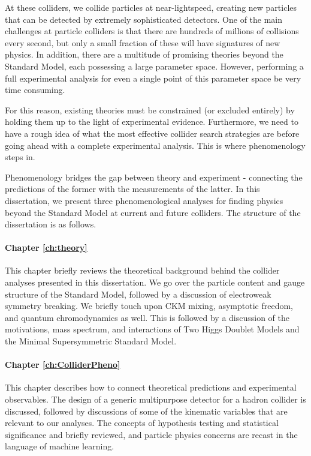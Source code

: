 At these colliders, we collide particles at near-lightspeed, creating new particles that can be detected by extremely sophisticated detectors. One of the main challenges at particle colliders is that there are hundreds of millions of collisions every second, but only a small fraction of these will have signatures of new physics. In addition, there are a multitude of promising theories beyond the Standard Model, each possessing a large parameter space. However, performing a full experimental analysis for even a single point of this parameter space be very time consuming.

For this reason, existing theories must be constrained (or excluded entirely) by holding them up to the light of experimental evidence. Furthermore, we need to have a rough idea of what the most effective collider search strategies are before going ahead with a complete experimental analysis. This is where phenomenology steps in.

Phenomenology bridges the gap between theory and experiment - connecting the predictions of the former with the measurements of the latter. In this dissertation, we present three phenomenological analyses for finding physics beyond the Standard Model at current and future colliders. The structure of the dissertation is as follows.

\paragraph{Chapter \ref{ch:theory}} This chapter briefly reviews the theoretical background behind the collider analyses presented in this dissertation. We go over the particle content and gauge structure of the Standard Model, followed by a discussion of electroweak symmetry breaking. We briefly touch upon CKM mixing, asymptotic freedom, and quantum chromodynamics as well. This is followed by a discussion of the motivations, mass spectrum, and interactions of Two Higgs Doublet Models and the Minimal Supersymmetric Standard Model.

\paragraph{Chapter \ref{ch:ColliderPheno}} This chapter describes how to connect theoretical predictions and experimental observables. The design of a generic multipurpose detector for a hadron collider is discussed, followed by discussions of some of the kinematic variables that are relevant to our analyses. The concepts of hypothesis testing and statistical significance and briefly reviewed, and particle physics concerns are recast in the language of machine learning.


